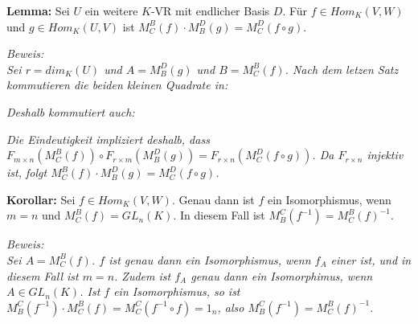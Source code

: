 \documentclass[11pt]{article}
\begin{document}
		\begin{framed}
			\textbf{Lemma:} Sei $U$ ein weitere $K$-VR mit endlicher Basis $D$. Für $f\in Hom_K(V,W)$ und $g\in Hom_K(U,V)$ ist 
			$M_C^B(f)\cdot M_B^D(g)=M_C^D(f\circ g)$.
		\end{framed}
		\textit{Beweis: \\
		Sei $r=dim_K(U)$ und $A=M_B^D(g)$ und $B=M_C^B(f)$. Nach dem letzen Satz kommutieren die beiden kleinen Quadrate in: }\\
		\begin{center}\end{center}
		\textit{Deshalb kommutiert auch:} \\
		\begin{center}\end{center}
		\textit{Die Eindeutigkeit impliziert deshalb, dass $F_{m\times n}(M_C^B(f))\circ F_{r\times m}(M_B^D(g))=F_{r\times n}
		(M_C^D(f\circ g))$. Da $F_{r\times n}$ injektiv ist, folgt $M_C^B(f)\cdot M_B^D(g)=M_C^D(f\circ g)$.} \\
		
		\begin{framed}
			\textbf{Korollar:} Sei $f\in Hom_K(V,W)$. Genau dann ist $f$ ein Isomorphismus, wenn $m=n$ und $M_C^B(f)=GL_n(K)$. In 
			diesem Fall ist $M_B^C(f^{-1})=M_C^B(f)^{-1}$.
		\end{framed}
		\textit{Beweis: \\
		Sei $A=M_C^B(f)$. $f$ ist genau dann ein Isomorphismus, wenn $f_A$ einer ist, und in diesem Fall ist $m=n$. Zudem ist 
		$f_A$ genau dann ein Isomorphimus, wenn $A\in GL_n(K)$. Ist $f$ ein Isomorphismus, so ist $M_B^C(f^{-1})\cdot 
		M_C^B(f)=M_C^C(f^{-1}\circ f)=1_n$, also $M_B^C(f^{-1})=M_C^B(f)^{-1}$.} \\
		
\end{document}
